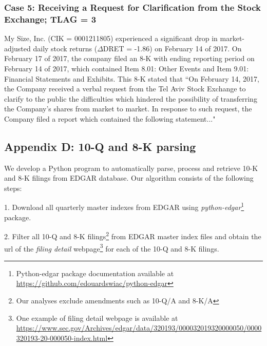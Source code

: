 \subsubsection*{Case 5: Receiving a Request for Clarification from the Stock Exchange; TLAG = 3}
My Size, Inc. (CIK = 0001211805) experienced a significant drop in market-adjusted daily stock returns ($\Delta$DRET = -1.86) on February 14 of 2017. On February 17 of 2017, the company filed an 8-K with ending reporting period on February 14 of 2017, which contained Item 8.01: Other Events and Item 9.01: Financial Statements and Exhibits. This 8-K stated that ``On February 14, 2017, the Company received a verbal request from the Tel Aviv Stock Exchange to clarify to the public the difficulties which hindered the possibility of transferring the Company's shares from market to market. In response to such request, the Company filed a report which contained the following statement..."

\newpage
\subsection*{Appendix D: 10-Q and 8-K parsing}
\label{appd}
We develop a Python program to automatically parse, process and retrieve 10-K and 8-K filings from EDGAR database. Our algorithm consists of the following steps:

1. Download all quarterly master indexes from EDGAR using \textit{python-edgar}\footnote{Python-edgar package documentation available at \url{https://github.com/edouardswiac/python-edgar}} package.

2. Filter all 10-Q and 8-K filings\footnote{Our analyses exclude amendments such as 10-Q/A and 8-K/A} from EDGAR master index files and obtain the url of the \textit{filing detail} webpage\footnote{One example of filing detail webpage is available at \url{https://www.sec.gov/Archives/edgar/data/320193/000032019320000050/0000320193-20-000050-index.html}} for each of the 10-Q and 8-K filings. 

